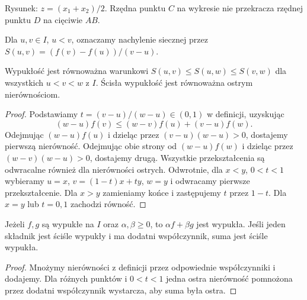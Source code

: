 \begin{center}

\small Rysunek: $z=(x_1+x_2)/2$. Rzędna punktu $C$ na wykresie nie przekracza rzędnej punktu $D$ na cięciwie $AB$.
\end{center}
Dla $u,v\in I$, $u<v$, oznaczamy nachylenie siecznej przez $S(u,v)=(f(v)-f(u))/(v-u)$.
\begin{twierdzenie}
\label{ma1:thm:convex-secants}
Wypukłość jest równoważna warunkowi
$S(u,v)\le S(u,w)\le S(v,w)$ dla wszystkich $u<v<w$ z $I$. Ścisła wypukłość jest równoważna ostrym nierównościom.
\end{twierdzenie}
\begin{proof}
Podstawiamy $t=(v-u)/(w-u)\in(0,1)$ w definicji, uzyskując
\[
 (w-u)f(v)\le(w-v)f(u)+(v-u)f(w).
\]
Odejmując $(w-u)f(u)$ i dzieląc przez $(v-u)(w-u)>0$, dostajemy pierwszą nierówność. Odejmując obie strony od $(w-u)f(w)$ i dzieląc przez $(w-v)(w-u)>0$, dostajemy drugą. Wszystkie przekształcenia są odwracalne również dla nierówności ostrych. Odwrotnie, dla $x<y$, $0<t<1$ wybieramy $u=x$, $v=(1-t)x+ty$, $w=y$ i odwracamy pierwsze przekształcenie. Dla $x>y$ zamieniamy końce i zastępujemy $t$ przez $1-t$. Dla $x=y$ lub $t=0,1$ zachodzi równość.
\end{proof}
\begin{stwierdzenie}
\label{ma1:prop:convex-combinations}
Jeżeli $f,g$ są wypukłe na $I$ oraz $\alpha,\beta\ge0$, to $\alpha f+\beta g$ jest wypukła. Jeśli jeden składnik jest ściśle wypukły i ma dodatni współczynnik, suma jest ściśle wypukła.
\end{stwierdzenie}
\begin{proof}
Mnożymy nierówności z definicji przez odpowiednie współczynniki i dodajemy. Dla różnych punktów i $0<t<1$ jedna ostra nierówność pomnożona przez dodatni współczynnik wystarcza, aby suma była ostra.
\end{proof}

